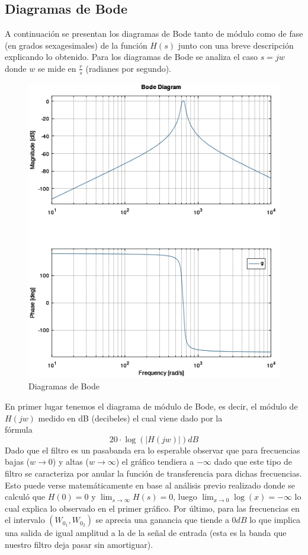 \documentclass[11pt,a4paper]{report}
\begin{document}
\subsection*{Diagramas de Bode}

A continuación se presentan los diagramas de Bode tanto de módulo como de fase (en grados sexagesimales) de la función $H(s)$ junto con una breve descripción explicando
lo obtenido. Para los diagramas de Bode se analiza el caso $s=jw$ donde $w$ se mide
en $\frac{r}{s}$ (radianes por segundo).

\begin{figure}[h!]
\includegraphics[scale=0.7]{DiagramasBode.png}
\caption{Diagramas de Bode}
\end{figure}

\newpage
En primer lugar tenemos el diagrama de módulo de Bode, es decir, el módulo de 
$H(jw)$ medido en dB (decibeles) el cual viene dado por la\\ fórmula
\[20 \cdot \log(|H(jw)|) dB\]
Dado que el filtro es un pasabanda era lo esperable
observar que para frecuencias bajas ($w\longrightarrow0$) y altas ($w\longrightarrow\infty$) el gráfico tendiera a $-\infty$ dado que este tipo de
filtro se caracteriza por anular la función de transferencia para dichas frecuencias.
Esto puede verse matemáticamente en base al análisis previo realizado donde se calculó que $H(0) = 0$ y $\lim_{s \to \infty} H(s) = 0$, luego 
$\lim_{x \to 0} \log(x) = -\infty$ lo cual explica lo observado en el primer gráfico.
Por último, para las frecuencias en el intervalo $(W_{0_{1}}, W_{0_{2}})$ se aprecia una ganancia que tiende a $0dB$ lo que implica una salida de igual amplitud a la de
la señal de entrada (esta es la banda que nuestro filtro deja pasar sin amortiguar).
\end{document}
